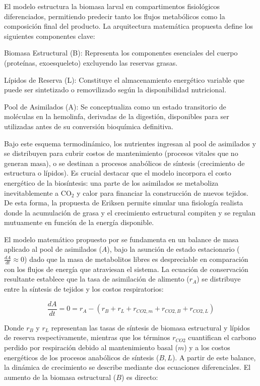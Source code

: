 El modelo estructura la biomasa larval en compartimentos fisiológicos diferenciados, permitiendo predecir tanto los flujos metabólicos como la composición final del producto. La arquitectura matemática propuesta define los siguientes componentes clave:

Biomasa Estructural (B): Representa los componentes esenciales del cuerpo (proteínas, exoesqueleto) excluyendo las reservas grasas.

Lípidos de Reserva (L): Constituye el almacenamiento energético variable que puede ser sintetizado o removilizado según la disponibilidad nutricional.

Pool de Asimilados (A): Se conceptualiza como un estado transitorio de moléculas en la hemolinfa, derivadas de la digestión, disponibles para ser utilizadas antes de su conversión bioquímica definitiva.

Bajo este esquema termodinámico, los nutrientes ingresan al pool de asimilados y se distribuyen para cubrir costos de mantenimiento (procesos vitales que no generan masa), o se destinan a procesos anabólicos de síntesis (crecimiento de estructura o lípidos). Es crucial destacar que el modelo incorpora el costo energético de la biosíntesis: una parte de los asimilados se metaboliza inevitablemente a CO$_2$ y calor para financiar la construcción de nuevos tejidos. De esta forma, la propuesta de Eriksen permite simular una fisiología realista donde la acumulación de grasa y el crecimiento estructural compiten y se regulan mutuamente en función de la energía disponible.

El modelo matemático propuesto por \parencite{eriksenDynamicModellingFeed2022} se fundamenta en un balance de masa 
aplicado al pool de asimilados ($A$), bajo la asunción de estado estacionario ($\frac{dA}{dt} \approx 0$) 
dado que la masa de metabolitos libres es despreciable en comparación con los flujos de energía que 
atraviesan el sistema. La ecuación de conservación resultante establece que la tasa 
de asimilación de alimento ($r_A$) se distribuye entre la síntesis de tejidos y los costos respiratorios:

\begin{equation}
\frac{dA}{dt} = 0 = r_A - (r_B + r_L + r_{CO2,m} + r_{CO2,B} + r_{CO2,L})
\end{equation}

Donde $r_B$ y $r_L$ representan las tasas de síntesis de biomasa estructural y lípidos de reserva 
respectivamente, mientras que los términos $r_{CO2}$ cuantifican el carbono perdido por respiración 
debido al mantenimiento basal ($m$) y a los costos energéticos de los procesos anabólicos de síntesis ($B, L$). 
A partir de este balance, la dinámica de crecimiento se describe mediante dos ecuaciones diferenciales. 
El aumento de la biomasa estructural ($B$) es directo:

